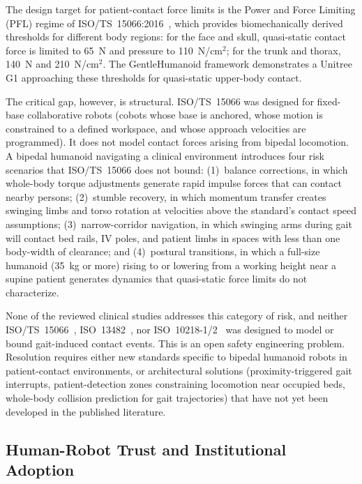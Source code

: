 The design target for patient-contact force limits is the Power and Force
Limiting (PFL) regime of ISO/TS~15066:2016~\cite{isots15066}, which provides
biomechanically derived thresholds for different body regions: for the face and skull, quasi-static
contact force is limited to 65~N and pressure to 110~N/cm$^2$; for the trunk and
thorax, 140~N and 210~N/cm$^2$. The GentleHumanoid framework demonstrates a
Unitree G1 approaching these thresholds for quasi-static upper-body contact.

The critical gap, however, is structural. ISO/TS~15066 was designed for
fixed-base collaborative robots (cobots whose base is anchored, whose motion is
constrained to a defined workspace, and whose approach velocities are programmed).
It does not model contact forces arising from bipedal locomotion. A bipedal
humanoid navigating a clinical environment introduces four risk scenarios that
ISO/TS~15066 does not bound: (1)~balance corrections, in which whole-body torque
adjustments generate rapid impulse forces that can contact nearby persons;
(2)~stumble recovery, in which momentum transfer creates swinging limbs and torso
rotation at velocities above the standard's contact speed assumptions;
(3)~narrow-corridor navigation, in which swinging arms during gait will contact
bed rails, IV poles, and patient limbs in spaces with less than one body-width of
clearance; and (4)~postural transitions, in which a full-size humanoid (35~kg or
more) rising to or lowering from a working height near a supine patient generates
dynamics that quasi-static force limits do not characterize.

None of the reviewed clinical studies addresses this category of risk, and neither
ISO/TS~15066~\cite{isots15066}, ISO~13482~\cite{iso13482}, nor
ISO~10218-1/2~\cite{iso10218_1,iso10218_2} was designed to model or bound
gait-induced contact events. This is an open safety engineering problem.
Resolution requires either new standards specific to bipedal humanoid robots in
patient-contact environments, or architectural solutions (proximity-triggered
gait interrupts, patient-detection zones constraining locomotion near occupied
beds, whole-body collision prediction for gait trajectories) that have not yet
been developed in the published literature.

\subsection{Human-Robot Trust and Institutional Adoption}
\label{sec:trust}

